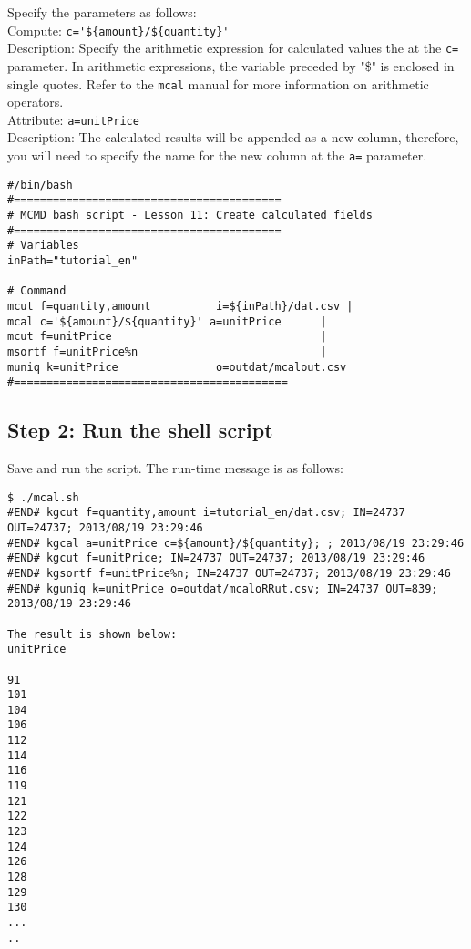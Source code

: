 {\setlength{\parindent}{0cm}

Specify the parameters as follows: \\

Compute: 		\verb|c='${amount}/${quantity}'| \\
Description: 	Specify the arithmetic expression for calculated values the at the \verb|c=| parameter.  In arithmetic expressions, the variable preceded by "\$" is enclosed in single quotes. Refer to the \verb|mcal| manual for more information on arithmetic operators. \\

Attribute: 		\verb|a=unitPrice| \\
Description: 	The calculated results will be appended as a new column, therefore, you will need to specify the name for the new column at the \verb|a=| parameter.\\
}

\begin{verbatim}
#/bin/bash
#=========================================
# MCMD bash script - Lesson 11: Create calculated fields
#=========================================
# Variables
inPath="tutorial_en"

# Command 
mcut f=quantity,amount          i=${inPath}/dat.csv | 
mcal c='${amount}/${quantity}' a=unitPrice      |
mcut f=unitPrice                                |
msortf f=unitPrice%n                            |
muniq k=unitPrice               o=outdat/mcalout.csv
#==========================================
\end{verbatim}

\subsection{Step 2: Run the shell script}
 
Save and run the script. The run-time message is as follows: \\

\begin{verbatim}
$ ./mcal.sh 
#END# kgcut f=quantity,amount i=tutorial_en/dat.csv; IN=24737 OUT=24737; 2013/08/19 23:29:46
#END# kgcal a=unitPrice c=${amount}/${quantity}; ; 2013/08/19 23:29:46
#END# kgcut f=unitPrice; IN=24737 OUT=24737; 2013/08/19 23:29:46
#END# kgsortf f=unitPrice%n; IN=24737 OUT=24737; 2013/08/19 23:29:46
#END# kguniq k=unitPrice o=outdat/mcaloRRut.csv; IN=24737 OUT=839; 2013/08/19 23:29:46

The result is shown below: 
unitPrice

91
101
104
106
112
114
116
119
121
122
123
124
126
128
129
130
...
..
\end{verbatim}


